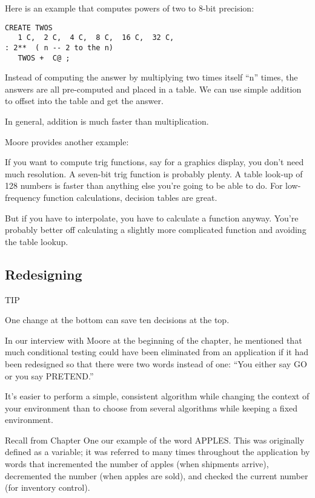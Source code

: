 Here is an example that computes powers of two to 8-bit precision:

\begin{verbatim}
CREATE TWOS
   1 C,  2 C,  4 C,  8 C,  16 C,  32 C,
: 2**  ( n -- 2 to the n)
   TWOS +  C@ ;
\end{verbatim}

Instead of computing the answer by multiplying two times itself ``n''
times, the answers are all pre-computed and placed in a table. We can use
simple addition to offset into the table and get the answer.

In general, addition is much faster than multiplication.

Moore provides another example:

If you want to compute trig functions, say for a graphics display, you don't
need much resolution. A seven-bit trig function is probably plenty. A table
look-up of 128 numbers is faster than anything else you're going to be able
to do. For low-frequency function calculations, decision tables are great.

But if you have to interpolate, you have to calculate a function anyway.
You're probably better off calculating a slightly more complicated function
and avoiding the table lookup.

\subsection{Redesigning}

TIP

One change at the bottom can save ten decisions at the top.

In our interview with Moore at the beginning of the chapter, he mentioned
that much conditional testing could have been eliminated from an
application if it had been redesigned so that there were two words instead
of one: ``You either say GO or you say PRETEND.''

It's easier to perform a simple, consistent algorithm while changing
the context of your environment than to choose from several algorithms
while keeping a fixed environment.

Recall from Chapter One our example of the word APPLES. This
was originally defined as a variable; it was referred to many times
throughout the application by words that incremented the number of
apples (when shipments arrive), decremented the number (when apples are
sold), and checked the current number (for inventory control).

